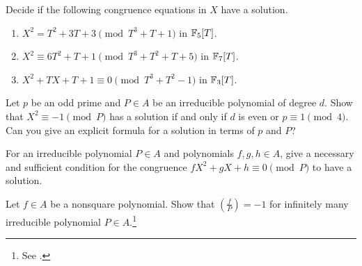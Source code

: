 \begin{exercise}\sage
    Decide if the following congruence equations in $X$ have a solution.
    \begin{enumerate}
        \item $X^2 = T^2 + 3T + 3 \pmod{T^3 + T + 1}$ in $\mathbb{F}_5[T]$.
        \item $X^2 \equiv 6T^2 + T + 1 \pmod{T^3 + T^2 + T + 5}$ in $\mathbb{F}_7[T]$.
        \item $X^2 + TX + T + 1 \equiv 0 \pmod{T^3 + T^2 - 1}$ in $\mathbb{F}_3[T]$.
    \end{enumerate}
\end{exercise}

\begin{exercise}
    Let $p$ be an odd prime and $P \in A$ be an irreducible polynomial of degree $d$.
    Show that $X^2 \equiv -1 \pmod{P}$ has a solution if and only if $d$ is even or $p \equiv 1 \pmod{4}$.
    Can you give an explicit formula for a solution in terms of $p$ and $P$?
\end{exercise}

\begin{exercise}
    For an irreducible polynomial $P \in A$ and polynomials $f, g, h \in A$, give a necessary and sufficient condition for the congruence $f X^2 + g X + h \equiv 0 \pmod{P}$ to have a solution.
\end{exercise}

\begin{exercise}
    Let $f \in A$ be a nonsquare polynomial. Show that $\left(\frac{f}{P}\right) = -1$ for infinitely many irreducible polynomial $P \in A$.\footnote{See \cite[Theorem 4.5]{conrad_rec_odd}.}
\end{exercise}


\newpage
